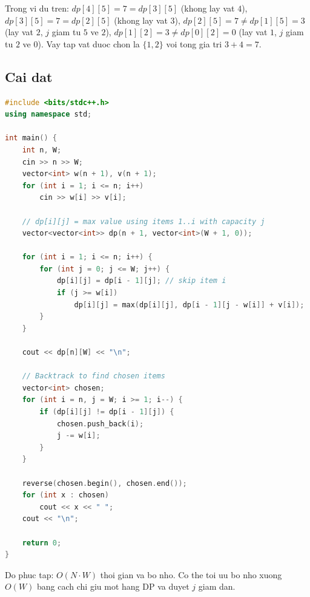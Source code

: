 Trong vi du tren: $dp[4][5] = 7 = dp[3][5]$ (khong lay vat $4$),
$dp[3][5] = 7 = dp[2][5]$ (khong lay vat $3$),
$dp[2][5] = 7 \neq dp[1][5] = 3$ (lay vat $2$, $j$ giam tu $5$ ve $2$),
$dp[1][2] = 3 \neq dp[0][2] = 0$ (lay vat $1$, $j$ giam tu $2$ ve $0$).
Vay tap vat duoc chon la $\{1, 2\}$ voi tong gia tri $3 + 4 = 7$.

\subsection{Cai dat}

\begin{lstlisting}[language=C++]
#include <bits/stdc++.h>
using namespace std;

int main() {
    int n, W;
    cin >> n >> W;
    vector<int> w(n + 1), v(n + 1);
    for (int i = 1; i <= n; i++)
        cin >> w[i] >> v[i];

    // dp[i][j] = max value using items 1..i with capacity j
    vector<vector<int>> dp(n + 1, vector<int>(W + 1, 0));

    for (int i = 1; i <= n; i++) {
        for (int j = 0; j <= W; j++) {
            dp[i][j] = dp[i - 1][j]; // skip item i
            if (j >= w[i])
                dp[i][j] = max(dp[i][j], dp[i - 1][j - w[i]] + v[i]);
        }
    }

    cout << dp[n][W] << "\n";

    // Backtrack to find chosen items
    vector<int> chosen;
    for (int i = n, j = W; i >= 1; i--) {
        if (dp[i][j] != dp[i - 1][j]) {
            chosen.push_back(i);
            j -= w[i];
        }
    }

    reverse(chosen.begin(), chosen.end());
    for (int x : chosen)
        cout << x << " ";
    cout << "\n";

    return 0;
}
\end{lstlisting}

Do phuc tap: $O(N \cdot W)$ thoi gian va bo nho.
Co the toi uu bo nho xuong $O(W)$ bang cach chi giu mot hang DP va duyet $j$ giam dan.
